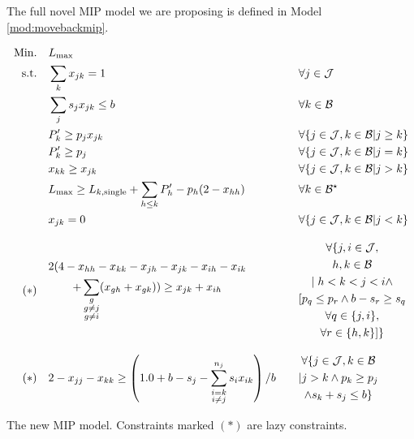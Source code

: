 \documentclass[oribibl]{llncs}
\def\Lmax{{L_{\mathrm{max}}}}
\begin{document}
The full novel MIP model we are proposing is defined in Model \ref{mod:movebackmip}.

\begin{model}
\begin{alignat}{2}
\mathrm{Min.}\quad & \Lmax && \\
\mathrm{s.t.}\quad & \label{mbm:eq7}\sum_{k} x_{jk} = 1 \quad && \forall j \in \mathcal{J} \\
& \label{mbm:eq6}\sum_{j} s_j x_{jk} \leq b \quad && \forall k \in \mathcal{B} \\
&\label{mbm:eq3} P'_k \geq p_j x_{jk} \quad && \forall \{j \in \mathcal{J}, k \in \mathcal{B} | j \geq k\} \\
&\label{mbm:eq10} P'_k \geq p_j \quad && \forall \{j \in \mathcal{J}, k \in \mathcal{B} | j = k\} \\
&\label{mbm:eq5} x_{kk} \geq x_{jk} \quad && \forall \{j \in \mathcal{J}, k \in \mathcal{B} | j > k\} \\
&\label{mbm:eq4} \Lmax \geq L_{k,\mathrm{single}} + \sum_{h\leq k} P'_h - p_h(2 -
x_{hh}) \quad && \forall k \in \mathcal{B}^\star \\
  \label{mbm:eq1} & x_{jk} = 0 \quad && \forall \{j \in \mathcal{J}, k \in \mathcal{B} | j < k\}
  \\[2ex]
  (*)\quad \label{mbm:eq8}   & \begin{gathered} 2 (  4 - x_{hh} - x_{kk} - x_{jh} - x_{jk} -
x_{ih} - x_{ik}\hfill \\+ \sum_{\substack{{g}\\{g \neq j}\\{g \neq
i}}} (x_{gh} + x_{gk}) ) \geq x_{jk} + x_{ih} \end{gathered}
\quad && \begin{gathered} \forall\{ j, i \in \mathcal{J}, \\ h, k \in
\mathcal{B} \\|\; h < k <
j < i \land \\ [p_q \leq p_r \land b - s_r \geq s_q\\ \forall q \in
\{j,i\}, \\ \forall r
\in \{h,k\}] \} \end{gathered}
 \\[2ex]
(*)\quad &  \label{mbm:eq11}2 - x_{jj} - x_{kk} \geq \left(1.0 + b - s_j -
\sum_{\substack{{i = k}\\{i \neq j}}}^{n_j} s_i
x_{ik}\right) / b \quad && \begin{gathered} \forall \{j \in \mathcal{J},k \in \mathcal{B} \\| j > k 
\land p_k \geq p_j \\ \land s_k + s_j \leq b\}\end{gathered}
\end{alignat}
\caption{The new MIP model. Constraints marked $(*)$ are lazy constraints.}
\label{mod:movebackmip}
\end{model}
\end{document}
